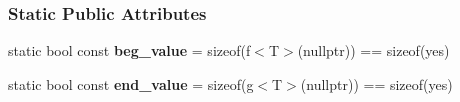 \subsubsection*{Static Public Attributes}
\begin{DoxyCompactItemize}
\item 
static bool const {\bfseries beg\+\_\+value} = sizeof(f$<$T$>$(nullptr)) == sizeof(yes)\hypertarget{structpretty__print_1_1detail_1_1has__begin__end_ae4d381032b242cada390b1a4faa92b9f}{}\label{structpretty__print_1_1detail_1_1has__begin__end_ae4d381032b242cada390b1a4faa92b9f}

\item 
static bool const {\bfseries end\+\_\+value} = sizeof(g$<$T$>$(nullptr)) == sizeof(yes)\hypertarget{structpretty__print_1_1detail_1_1has__begin__end_a57583b09a965f62a2d7af130ae9a7495}{}\label{structpretty__print_1_1detail_1_1has__begin__end_a57583b09a965f62a2d7af130ae9a7495}

\end{DoxyCompactItemize}
